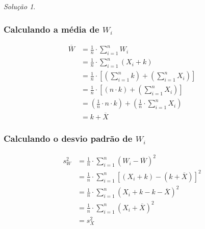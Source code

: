 \documentclass[
]{latex/krantz}
\theoremstyle{definition}
\theoremstyle{definition}
\theoremstyle{definition}
\theoremstyle{definition}
\theoremstyle{remark}
\newtheorem*{solution}{Solução}
\begin{document}
\begin{solution}
\leavevmode

\hypertarget{calculando-a-muxe9dia-de-w_i}{%
\subsubsection*{\texorpdfstring{Calculando a média de \(W_i\)}{Calculando a média de W\_i}}\label{calculando-a-muxe9dia-de-w_i}}

\[
\begin{split}
\overline{W} & = \frac{1}{n} \cdot \sum _{i = 1}^{n} W_i \\
             & = \frac{1}{n} \cdot \sum _{i = 1}^{n} \left( X_i + k \right) \\
             & = \frac{1}{n} \cdot \left[ \left( \sum _{i = 1}^{n} k \right) + \left( \sum _{i = 1}^{n} X_i \right) \right]\\
             & = \frac{1}{n} \cdot \left[ \left( n \cdot k \right) + \left( \sum _{i = 1}^{n} X_i \right) \right]\\
             & = \left( \frac{1}{n} \cdot n \cdot k \right) + \left( \frac{1}{n} \cdot\sum _{i = 1}^{n} X_i \right) \\
             & = k + \overline{X}
\end{split}
\]

\hypertarget{calculando-o-desvio-padruxe3o-de-w_i}{%
\subsubsection*{\texorpdfstring{Calculando o desvio padrão de \(W_i\)}{Calculando o desvio padrão de W\_i}}\label{calculando-o-desvio-padruxe3o-de-w_i}}

\[
\begin{split}
s_W^2 & = \frac{1}{n} \cdot \sum_{i = 1}^{n}(W_i - \overline{W})^2 \\
      & = \frac{1}{n} \cdot \sum_{i = 1}^{n}\left[ \left( X_i + k \right) - \left(k + \overline{X} \right) \right]^2 \\
      & = \frac{1}{n} \cdot \sum_{i = 1}^{n}\left( X_i + k - k - \overline{X} \right)^2 \\
      & = \frac{1}{n} \cdot \sum_{i = 1}^{n}\left( X_i + \overline{X} \right)^2 \\
      & = s_X^2
\end{split}
\]


\end{solution}
\end{document}
